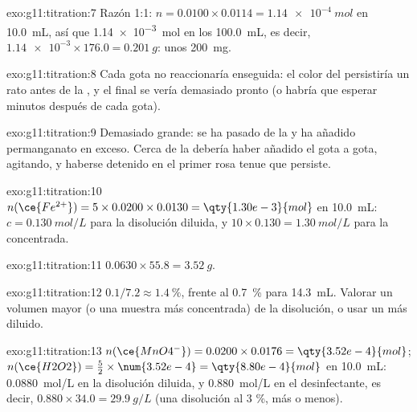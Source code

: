 \begin{solution}{exo:g11:titration:7}
Razón 1:1: $n = 0.0100 \times 0.0114 = \qty{1.14e-4}{mol}$ en
\qty{10.0}{mL}, así que \qty{1.14e-3}{mol} en los \qty{100.0}{mL}, es
decir, $\num{1.14e-3} \times 176.0 = \qty{0.201}{g}$: unos
\qty{200}{mg}.
\end{solution}

\begin{solution}{exo:g11:titration:8}
Cada gota no reaccionaría enseguida: el color del  persistiría
un rato antes de la , y el final se vería demasiado pronto
(o habría que esperar minutos después de cada gota).
\end{solution}

\begin{solution}{exo:g11:titration:9}
Demasiado grande: se ha pasado de la  y ha añadido
permanganato en exceso. Cerca de la  debería haber añadido
el  gota a gota, agitando, y haberse detenido en el primer rosa
tenue que persiste.
\end{solution}

\begin{solution}{exo:g11:titration:10}
$n(\ce{Fe^{2+}}) = 5 \times 0.0200 \times 0.0130 = \qty{1.30e-3}{mol}$
en \qty{10.0}{mL}: $c = \qty{0.130}{mol/L}$ para la disolución diluida,
y $10 \times 0.130 = \qty{1.30}{mol/L}$ para la concentrada.
\end{solution}

\begin{solution}{exo:g11:titration:11}
$0.0630 \times 55.8 = \qty{3.52}{g}$.
\end{solution}

\begin{solution}{exo:g11:titration:12}
$0.1 / 7.2 \approx \qty{1.4}{\percent}$, frente al \qty{0.7}{\percent}
para \qty{14.3}{mL}. Valorar un volumen mayor (o una muestra más
concentrada) de la disolución, o usar un  más diluido.
\end{solution}

\begin{solution}{exo:g11:titration:13}
$n(\ce{MnO4^-}) = 0.0200 \times 0.0176 = \qty{3.52e-4}{mol}$;
$n(\ce{H2O2}) = \frac{5}{2} \times \num{3.52e-4} = \qty{8.80e-4}{mol}$ en
\qty{10.0}{mL}: \qty{0.0880}{mol/L} en la disolución diluida, y
\qty{0.880}{mol/L} en el desinfectante, es decir,
$0.880 \times 34.0 = \qty{29.9}{g/L}$ (una disolución al 3 \%, más o
menos).
\end{solution}

